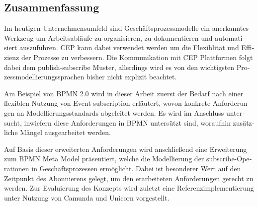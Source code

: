 \begin{otherlanguage}{ngerman}
\chapter*{Zusammenfassung}

Im heutigen Unternehmensumfeld sind Geschäftsprozessmodelle ein anerkanntes Werkzeug um Arbeitsabläufe zu organisieren, zu dokumentieren und automatisiert auszuführen. \acf{CEP} kann dabei verwendet werden um die Flexiblität und Effizienz der Prozesse zu verbessern.
Die Kommunikation mit CEP Plattformen folgt dabei dem publish-subscribe Muster, allerdings wird es von den wichtigsten Prozessmodellierungssprachen bisher nicht explizit beachtet.

Am Beispiel von BPMN 2.0 wird in dieser Arbeit zuerst der Bedarf nach einer flexiblen Nutzung von Event subscription erläutert, wovon konkrete Anforderungen an Modellierungsstandards abgeleitet werden. Es wird im Anschluss untersucht, inwiefern diese Anforderungen in BPMN untersützt sind, woraufhin zusätzliche Mängel ausgearbeitet werden.

Auf Basis dieser erweiterten Anforderungen wird anschließend eine Erweiterung zum BPMN Meta Model präsentiert, welche die Modellierung der subscribe-Operationen in Geschäftsprozessen ermöglicht. Dabei ist besonderer Wert auf den Zeitpunkt des Abonnierens gelegt, um den erarbeiteten Anforderungen gerecht zu werden.
Zur Evaluierung des Konzepts wird zuletzt eine Referenzimplementierung unter Nutzung von Camunda und Unicorn vorgestellt.


\end{otherlanguage}

\endgroup			

\vfill